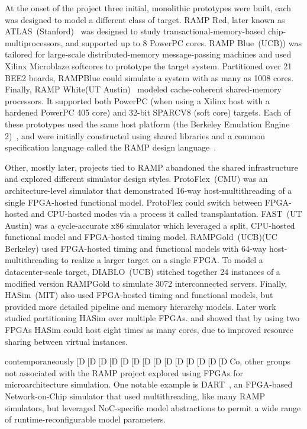 At the onset of the project three initial, monolithic prototypes were built,
each was designed to model a different class of target.
RAMP Red, later known as ATLAS~(Stanford)~\cite{ATLAS} was designed to study transactional-memory-based chip-multiprocessors, and supported up to 8 PowerPC cores.
RAMP Blue~(UCB)\cite{RAMPBlue}) was tailored for large-scale distributed-memory message-passing machines and used Xilinx
Microblaze softcores to prototype the target system. Partitioned over 21
BEE2 boards, RAMPBlue could simulate a system with as many as 1008 cores.
Finally, RAMP White(UT Austin)~\cite{RAMPWhite} modeled cache-coherent
shared-memory processors. It supported both PowerPC (when using a Xilinx
host with a hardened PowerPC 405 core) and 32-bit SPARCV8 (soft core) targets.
Each of these prototypes used the same host platform (the Berkeley Emulation
Engine 2)~\cite{BEE2}, and were initially constructed using shared libraries and a common
specification language called the RAMP design language~\cite{RDL}.

Other, mostly later, projects tied to RAMP abandoned the shared infrastructure
and explored different simulator design styles.
ProtoFlex~(CMU)\cite{ProtoFlex} was an architecture-level simulator that
demonstrated 16-way host-multithreading of a single FPGA-hosted functional
model.  ProtoFlex could switch between FPGA-hosted and CPU-hosted modes via
a process it called transplantation. FAST~(UT Austin)\cite{FAST} was a cycle-accurate
x86 simulator which leveraged a split, CPU-hosted functional model and FPGA-hosted
timing model. RAMPGold~(UCB)\cite{RAMPGold}(UC Berkeley) used FPGA-hosted timing
and functional models with 64-way host-multithreading to realize a larger
target on a single FPGA.  To model a datacenter-scale target,
DIABLO~(UCB)\cite{Diablo} stitched together 24 instances of a modified version RAMPGold to simulate 3072 interconnected
servers.  Finally, HASim~\cite{HASim}(MIT) also used FPGA-hosted timing and
functional models, but provided more detailed pipeline and memory hierarchy
models. Later work studied partitioning HASim over multiple FPGAs.
\cite{LIFPGADesign} and showed that by using two FPGAs HASim could host eight
times as many cores, due to improved resource sharing between virtual
instances.

contemporaneously[D[D[D[D[D[D[D[D[D[D[D[D[D[DCo, other groups not associated with the RAMP project explored
using FPGAs for microarchitecture simulation.  One notable example is
DART~\cite{DART}, an FPGA-based Network-on-Chip simulator that used
multithreading, like many RAMP simulators, but leveraged NoC-specific model abstractions
to permit a wide range of runtime-reconfigurable model parameters.

